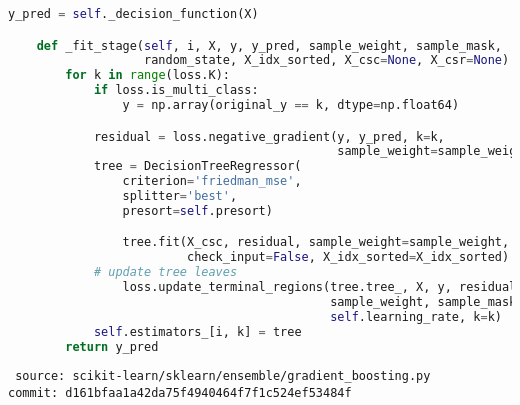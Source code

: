 

\begin{frame}[fragile]
    \begin{lstlisting}[language=Python,style=myScalastyle]
    y_pred = self._decision_function(X)

    def _fit_stage(self, i, X, y, y_pred, sample_weight, sample_mask,
                   random_state, X_idx_sorted, X_csc=None, X_csr=None):
        for k in range(loss.K):
            if loss.is_multi_class:
                y = np.array(original_y == k, dtype=np.float64)

            residual = loss.negative_gradient(y, y_pred, k=k,
                                              sample_weight=sample_weight)
            tree = DecisionTreeRegressor(
                criterion='friedman_mse',
                splitter='best',
                presort=self.presort)

                tree.fit(X_csc, residual, sample_weight=sample_weight,
                         check_input=False, X_idx_sorted=X_idx_sorted)
            # update tree leaves
                loss.update_terminal_regions(tree.tree_, X, y, residual, y_pred,
                                             sample_weight, sample_mask,
                                             self.learning_rate, k=k)
            self.estimators_[i, k] = tree
        return y_pred
    \end{lstlisting}
    {\tiny \tt
    source: scikit-learn/sklearn/ensemble/gradient\_boosting.py \\[-2ex]
    commit: d161bfaa1a42da75f4940464f7f1c524ef53484f}
\end{frame}
